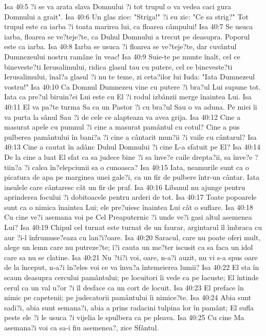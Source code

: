 Isa 40:5  ?i se va arata slava Domnului ?i tot trupul o va vedea caci gura Domnului a grait".
Isa 40:6  Un glas zice: "Striga!" ?i eu zic: "Ce sa strig?" Tot trupul este ca iarba ?i toata marirea lui, ca floarea câmpului!
Isa 40:7  Se usuca iarba, floarea se ve?teje?te, ca Duhul Domnului a trecut pe deasupra. Poporul este ca iarba.
Isa 40:8  Iarba se usuca ?i floarea se ve?teje?te, dar cuvântul Dumnezeului nostru ramâne în veac!
Isa 40:9  Suie-te pe munte înalt, cel ce bineveste?ti Ierusalimului, ridica glasul tau cu putere, cel ce bineveste?ti Ierusalimului, înal?a glasul ?i nu te teme, zi ceta?ilor lui Iuda: "Iata Dumnezeul vostru!"
Isa 40:10  Ca Domnul Dumnezeu vine cu putere ?i bra?ul Lui supune tot. Iata ca pre?ul biruin?ei Lui este cu El ?i rodul izbânzii merge înaintea Lui.
Isa 40:11  El va pa?te turma Sa ca un Pastor ?i cu bra?ul Sau o va aduna. Pe miei îi va purta la sânul Sau ?i de cele ce alapteaza va avea grija.
Isa 40:12  Cine a masurat apele cu pumnul ?i cine a masurat pamântul cu cotul? Cine a pus pulberea pamântului în bani?a ?i cine a cântarit mun?ii ?i vaile cu cântarul?
Isa 40:13  Cine a cautat în adânc Duhul Domnului ?i cine L-a sfatuit pe El?
Isa 40:14  De la cine a luat El sfat ca sa judece bine ?i sa înve?e caile drepta?ii, sa înve?e ?tiin?a ?i calea în?elepciunii sa o cunoasca?
Isa 40:15  Iata, neamurile sunt ca o picatura de apa pe marginea unei gale?i, ca un fir de pulbere într-un cântar. Iata insulele care cântaresc cât un fir de praf.
Isa 40:16  Libanul nu ajunge pentru aprinderea focului ?i dobitoacele pentru arderi de tot.
Isa 40:17  Toate popoarele sunt ca o nimica înaintea Lui; ele pre?uiesc înaintea Lui cât o suflare.
Isa 40:18  Cu cine ve?i asemana voi pe Cel Preaputernic ?i unde ve?i gasi altul asemenea Lui?
Isa 40:19  Chipul cel turnat este turnat de un faurar, argintarul îl îmbraca cu aur ?i-l înfrumuse?eaza cu lan?i?oare.
Isa 40:20  Saracul, care nu poate oferi mult, alege un lemn care nu putreze?te; î?i cauta un me?ter iscusit ca sa faca un idol care sa nu se clatine.
Isa 40:21  Nu ?ti?i voi, oare, n-a?i auzit, nu vi s-a spus oare de la început, n-a?i în?eles voi ce va înva?a întemeierea lumii?
Isa 40:22  El sta în scaun deasupra cercului pamântului; pe locuitori îi vede ca pe lacuste; El întinde cerul ca un val u?or ?i îl desface ca un cort de locuit.
Isa 40:23  El preface în nimic pe capetenii; pe judecatorii pamântului îi nimice?te.
Isa 40:24  Abia sunt sadi?i, abia sunt semana?i, abia a prins radacini tulpina lor în pamânt; El sufla peste ele ?i le usuca ?i vijelia le spulbera ca pe pleava.
Isa 40:25  Cu cine Ma asemana?i voi ca sa-i fiu asemenea?, zice Sfântul.
